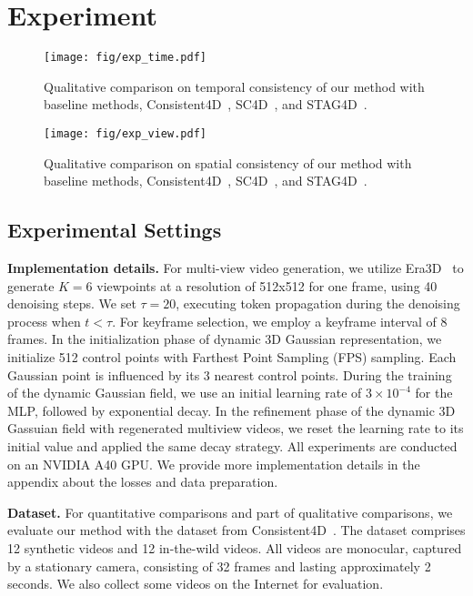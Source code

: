 \section{Experiment}


\begin{figure}[t]
    \centering
    \texttt{[image: fig/exp\_time.pdf]}
    \caption{Qualitative comparison on temporal consistency of our method with baseline methods, Consistent4D~\citep{jiang2023consistent4d}, SC4D~\citep{wu2024sc4d}, and STAG4D~\citep{zeng2024stag4d}.}
    \label{fig:exp-time}
\end{figure}

\begin{figure}[t]
    \centering
    \texttt{[image: fig/exp\_view.pdf]}
    \caption{Qualitative comparison on spatial consistency of our method with baseline methods, Consistent4D~\citep{jiang2023consistent4d}, SC4D~\citep{wu2024sc4d}, and STAG4D~\citep{zeng2024stag4d}.}
    \label{fig:exp-view}
\end{figure}
\subsection{Experimental Settings}

\textbf{Implementation details.} For multi-view video generation, we utilize Era3D~\citep{li2024era3d} to generate $K=6$ viewpoints at a resolution of 512x512 for one frame, using 40 denoising steps. We set $\tau =20$, executing token propagation during the denoising process when $t<\tau$. For keyframe selection, we employ a keyframe interval of 8 frames. In the initialization phase of dynamic 3D Gaussian representation, we initialize 512 control points with Farthest Point Sampling (FPS) sampling. Each Gaussian point is influenced by its 3 nearest control points. During the training of the dynamic Gaussian field, we use an initial learning rate of $3\times 10^{-4}$ for the MLP, followed by exponential decay. In the refinement phase of the dynamic 3D Gassuian field with regenerated multiview videos, we reset the learning rate to its initial value and applied the same decay strategy. All experiments are conducted on an NVIDIA A40 GPU. We provide more implementation details in the appendix about the losses and data preparation.

\textbf{Dataset.} For quantitative comparisons and part of qualitative comparisons, we evaluate our method with the dataset from Consistent4D~\citep{jiang2023consistent4d}. The dataset comprises 12 synthetic videos and 12 in-the-wild videos. All videos are monocular, captured by a stationary camera, consisting of 32 frames and lasting approximately 2 seconds. We also collect some videos on the Internet for evaluation.


